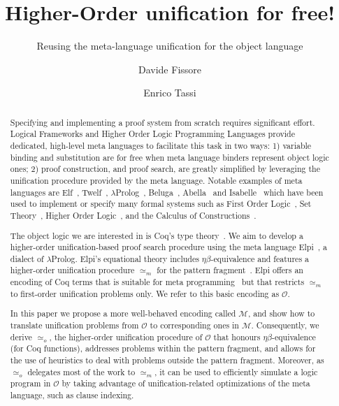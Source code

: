 \documentclass[sigconf,natbib=false,review]{acmart}
\newcommand{\UnifRel}{\ensuremath{\simeq}}
\newcommand{\Uo}{\texorpdfstring{\ensuremath{\UnifRel_o}\xspace}{unif\_o}}
\newcommand{\Ue}{\ensuremath{\UnifRel_m}\xspace}
\newcommand{\Fo}{\texorpdfstring{\ensuremath{\mathcal{O}\xspace}}{O}} %
\newcommand{\Ho}{\texorpdfstring{\ensuremath{\mathcal{M}}\xspace}{M}}
\begin{document}
\title{Higher-Order unification for free!}
\subtitle{Reusing the meta-language unification for the object language}

\author{Davide Fissore}

\author{Enrico Tassi}

\begin{abstract}
  Specifying and implementing a proof system from scratch requires significant effort.
  Logical Frameworks and Higher Order Logic Programming Languages provide
  dedicated, high-level meta languages to facilitate this task in two
  ways: 1) variable binding and substitution are for free when meta language binders
  represent object logic ones; 2) proof construction, and %
  proof search, are
  greatly simplified by leveraging the unification procedure provided by the meta language.
  Notable examples of meta languages are Elf~\cite{elf}, Twelf~\cite{twelf},
  $\lambda$Prolog~\cite{miller_nadathur_2012}, Beluga~\cite{Beluga}, Abella~\cite{gacek2008abella} and
  Isabelle~\cite{10.1007/978-3-540-71067-7_7}
  which have been %
  used to implement or specify %
  many
  formal systems such as
  First Order Logic~\cite{felty88cade},
  Set Theory~\cite{10.1007/BF00881873},
  Higher Order Logic~\cite{books/sp/NipkowPW02}, and %
  the Calculus of
  Constructions~\cite{felty93lics}.

  The object logic we are interested in is
  Coq's type theory~\cite{Coq-refman}. We aim to
  develop a higher-order unification-based 
  proof search procedure %
  using the meta language
  Elpi~\cite{dunchev15lpar}, a dialect of $\lambda$Prolog.
  Elpi's equational theory includes
  $\eta\beta$-equivalence and features a
  higher-order unification procedure \Ue 
  for the
  pattern fragment~\cite{miller92jsc}.
  Elpi offers an encoding of Coq terms that is suitable
  for meta programming~\cite{tassi:hal-01637063,tassi:hal-01897468,gregoire:hal-03800154,newtc}
  but that restricts \Ue to first-order unification problems only.
  We refer to this basic encoding as \Fo.
  
  In this paper we propose a more well-behaved encoding called \Ho,
  and show how to translate unification problems from \Fo{}
  to corresponding ones in \Ho.
  Consequently, we derive \Uo{}, the higher-order unification procedure of \Fo{}
    that honours $\eta\beta$-equivalence (for Coq functions), addresses
  problems within the pattern fragment, and allows
  for the use of heuristics to deal with problems outside the
  pattern fragment. Moreover, as \Uo{} delegates most of the work to \Ue,
  it can be used to efficiently simulate a logic program in \Fo{} by
  taking advantage of
  unification-related optimizations of the meta language, such as clause indexing.

\end{abstract}
\end{document}
